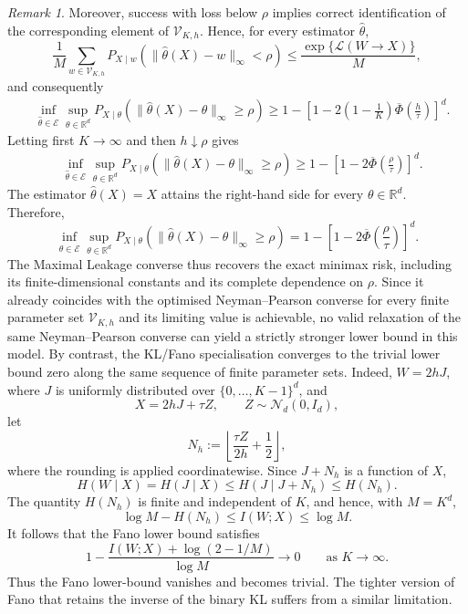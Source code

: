 \documentclass[11pt]{article}
\theoremstyle{definition}
\theoremstyle{remark}
\newtheorem{remark}[theorem]{Remark}
\newcommand{\1}{\boldsymbol{1}}
\newcommand{\ml}[2]{\mathcal{L}(#1\!\to\!#2)}
\begin{document}
\begin{remark}
Moreover, success with loss below $\rho$ implies correct identification of the
corresponding element of $\mathcal V_{K,h}$. Hence, for every estimator
$\widehat\theta$,
\[
\frac1M
\sum_{w\in\mathcal V_{K,h}}
P_{X\mid w}
\left(
\|\widehat\theta(X)-w\|_\infty<\rho
\right)
\leq
\frac{\exp\{\ml{W}{X}\}}{M},
\]
and consequently
\begin{align}
&\inf_{\widehat\theta\in\mathcal E}
\sup_{\theta\in\mathbb R^d}
P_{X\mid\theta}
\left(
\|\widehat\theta(X)-\theta\|_\infty\geq\rho
\right)\geq
1-
\left[
1-
2\left(1-\frac1K\right)
\overline\Phi\left(\frac{h}{\tau}\right)
\right]^d.
\end{align}
Letting first $K\to\infty$ and then $h\downarrow\rho$ gives
\begin{align}
&\inf_{\widehat\theta\in\mathcal E}
\sup_{\theta\in\mathbb R^d}
P_{X\mid\theta}
\left(
\|\widehat\theta(X)-\theta\|_\infty\geq\rho
\right)\geq
1-
\left[
1-
2\overline\Phi\left(\frac{\rho}{\tau}\right)
\right]^d.
\end{align}
The estimator $\widehat\theta(X)=X$ attains the right-hand side for
every $\theta\in\mathbb R^d$. Therefore,
\[
\inf_{\widehat\theta\in\mathcal E}
\sup_{\theta\in\mathbb R^d}
P_{X\mid\theta}
\left(
\|\widehat\theta(X)-\theta\|_\infty\geq\rho
\right)
=
1-
\left[
1-
2\overline\Phi\left(\frac{\rho}{\tau}\right)
\right]^d.
\]
The Maximal Leakage converse thus recovers the exact minimax risk,
including its finite-dimensional constants and its complete dependence
on $\rho$. Since it already coincides with the optimised
Neyman--Pearson converse for every finite parameter set
$\mathcal V_{K,h}$ and its limiting value is achievable, no valid
relaxation of the same Neyman--Pearson converse can yield a strictly
stronger lower bound in this model.
By contrast, the KL/Fano specialisation converges to the trivial lower
bound zero along the same sequence of finite parameter sets. Indeed,
$W=2hJ$, where $J$ is uniformly distributed over
$\{0,\ldots,K-1\}^d$, and
\[
X=2hJ+\tau Z,
\qquad
Z\sim\mathcal N_d(0,I_d),
\]
let
\[
N_h
:=
\left\lfloor
\frac{\tau Z}{2h}+\frac12
\right\rfloor,
\]
where the rounding is applied coordinatewise. Since $J+N_h$ is a
function of $X$,
\[
H(W\mid X)
=
H(J\mid X)
\leq
H(J\mid J+N_h)
\leq
H(N_h).
\]
The quantity $H(N_h)$ is finite and independent of $K$, and hence,
with $M=K^d$,
\[
\log M-H(N_h)
\leq
I(W;X)
\leq
\log M.
\]
It follows that the Fano lower bound satisfies
\[
1-
\frac{
I(W;X)+\log(2-1/M)
}{
\log M
}
\longrightarrow0
\qquad
\text{as }K\to\infty.
\]
Thus the Fano lower-bound vanishes and becomes trivial. The tighter version of Fano that retains the inverse of the binary KL suffers from a similar limitation.
\end{remark}
\fi
\end{document}
